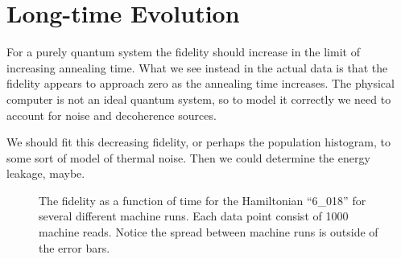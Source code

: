 \section{Long-time Evolution}
For a purely quantum system the fidelity should increase in the limit of increasing annealing time.  What we see instead in the actual data is that the fidelity appears to approach zero as the annealing time increases.  The physical computer is not an ideal quantum system, so to model it correctly we need to account for noise and decoherence sources.

We should fit this decreasing fidelity, or perhaps the population histogram, to some sort of model of thermal noise.  Then we could determine the energy leakage, maybe.







\begin{figure}
	\caption[Short Time Fidelities]{The fidelity as a function of time for the Hamiltonian ``6\_018'' for several different machine runs.  Each data point consist of 1000 machine reads.  Notice the spread between machine runs is outside of the error bars.}
	\label{fig:short_fidelity}
\end{figure}

